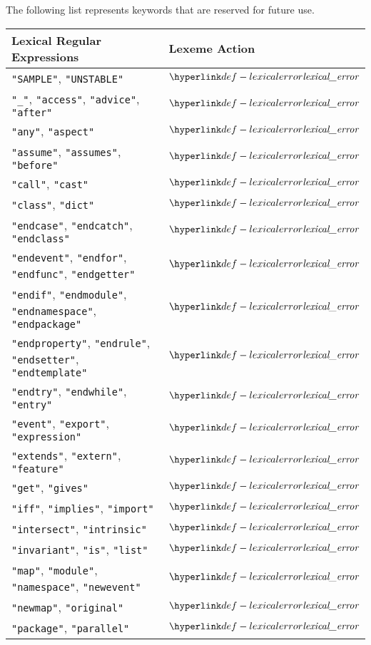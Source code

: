 The following list represents keywords that are reserved for future use.
\begin{center}
\begin{tabular}{ll}
\textbf{Lexical Regular Expressions} & \textbf{Lexeme Action}\\
\hline
\texttt{"SAMPLE"}, \texttt{"UNSTABLE"} & $\lexicalerror$ \\
\texttt{"\_"}, \texttt{"access"}, \texttt{"advice"}, \texttt{"after"} & $\lexicalerror$ \\
\texttt{"any"}, \texttt{"aspect"} & $\lexicalerror$ \\
\texttt{"assume"}, \texttt{"assumes"}, \texttt{"before"} & $\lexicalerror$ \\
\texttt{"call"}, \texttt{"cast"} & $\lexicalerror$ \\
\texttt{"class"}, \texttt{"dict"} & $\lexicalerror$ \\
\texttt{"endcase"}, \texttt{"endcatch"}, \texttt{"endclass"} & $\lexicalerror$ \\
\texttt{"endevent"}, \texttt{"endfor"}, \texttt{"endfunc"}, \texttt{"endgetter"} & $\lexicalerror$ \\
\texttt{"endif"}, \texttt{"endmodule"}, \texttt{"endnamespace"}, \texttt{"endpackage"} & $\lexicalerror$ \\
\texttt{"endproperty"}, \texttt{"endrule"}, \texttt{"endsetter"}, \texttt{"endtemplate"} & $\lexicalerror$ \\
\texttt{"endtry"}, \texttt{"endwhile"}, \texttt{"entry"} & $\lexicalerror$ \\
\texttt{"event"}, \texttt{"export"}, \texttt{"expression"} & $\lexicalerror$ \\
\texttt{"extends"}, \texttt{"extern"}, \texttt{"feature"} & $\lexicalerror$ \\
\texttt{"get"}, \texttt{"gives"} & $\lexicalerror$ \\
\texttt{"iff"}, \texttt{"implies"}, \texttt{"import"} & $\lexicalerror$ \\
\texttt{"intersect"}, \texttt{"intrinsic"} & $\lexicalerror$ \\
\texttt{"invariant"}, \texttt{"is"}, \texttt{"list"} & $\lexicalerror$ \\
\texttt{"map"}, \texttt{"module"}, \texttt{"namespace"}, \texttt{"newevent"} & $\lexicalerror$ \\
\texttt{"newmap"}, \texttt{"original"} & $\lexicalerror$ \\
\texttt{"package"}, \texttt{"parallel"} & $\lexicalerror$ \\

\end{tabular}
\end{center}
